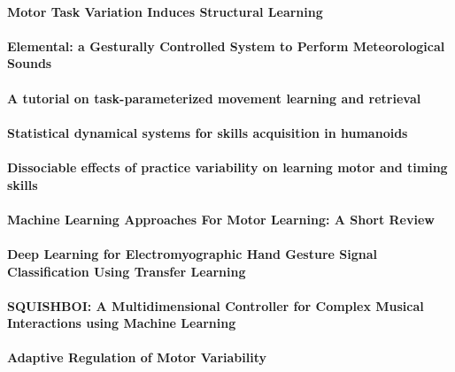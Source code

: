 \documentclass[11pt]{article}
\begin{document}
\paragraph{Motor Task Variation Induces Structural Learning} \citep{braun_motor_2009}

\paragraph{Elemental: a Gesturally Controlled System to Perform Meteorological Sounds} \citep{brizolara_elemental_2020}

\paragraph{A tutorial on task-parameterized movement learning and retrieval} \citep{calinon_tutorial_2016}

\paragraph{Statistical dynamical systems for skills acquisition in humanoids} \citep{calinon_statistical_2012}

\paragraph{Dissociable effects of practice variability on learning motor and timing skills} \citep{caramiaux_dissociable_2018}

\paragraph{Machine Learning Approaches For Motor Learning: A Short Review} \citep{caramiaux_machine_2020}

\paragraph{Deep Learning for Electromyographic Hand Gesture Signal Classification Using Transfer Learning} \citep{cote-allard_deep_2019}

\paragraph{SQUISHBOI: A Multidimensional Controller for Complex Musical Interactions using Machine Learning} \citep{desmith_squishboi_2020}

\paragraph{Adaptive Regulation of Motor Variability} \citep{dhawale_adaptive_2019}
\end{document}
